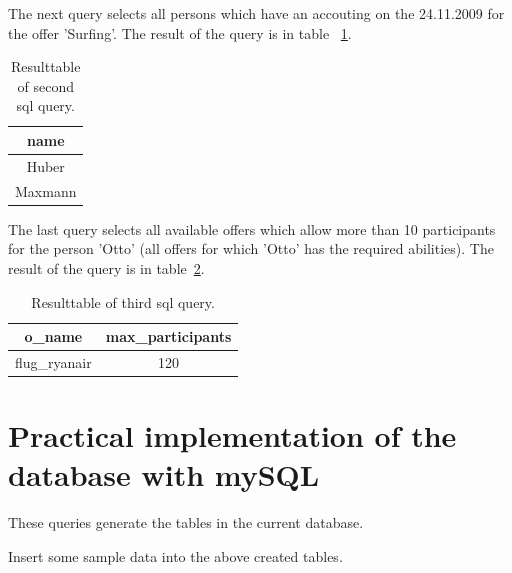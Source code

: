 \documentclass[12pt,a4paper,ngerman]{article}
\begin{document}
The next query selects all persons which have an accouting on the 24.11.2009 for the offer 'Surfing'. The result of the query is in table ~\ref{tab:sql2}.


\begin{table}[htbp]
\begin{center}\hspace*{-1,5cm}
\begin{tabular}
{| c |}
\hline
name \\ \hline \hline
Huber                      \\ \hline
Maxmann 										\\ \hline
\end{tabular}
\caption{Resulttable of second sql query.\label{tab:sql2}}
\end{center}
\end{table}

The last query selects all available offers which allow more than 10 participants for the person 'Otto' (all offers for which 'Otto' has the required abilities). The result of the query is in table~\ref{tab:sql3}.


\begin{table}[htbp]
\begin{center}\hspace*{-1,5cm}
\begin{tabular}
{| c | c |}
\hline
o\_name & max\_participants                      \\ \hline \hline
flug\_ryanair & 120											\\ \hline

\end{tabular}
\caption{Resulttable of third sql query.\label{tab:sql3}}
\end{center}
\end{table}

\section{Practical implementation of the database with mySQL}
These queries generate the tables in the current database.


Insert some sample data into the above created tables.

\end{document}
